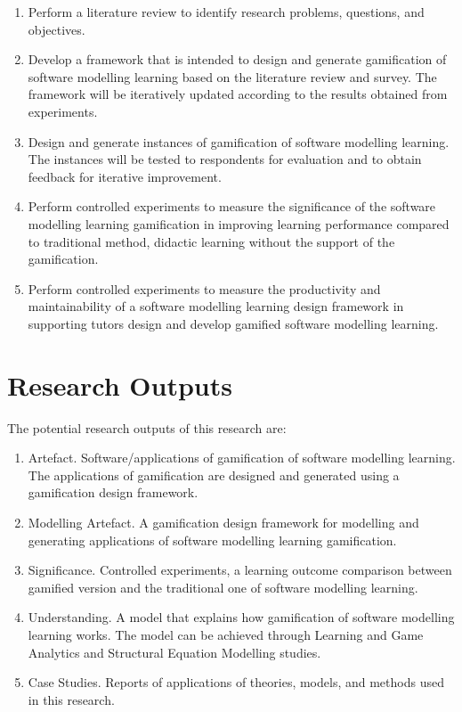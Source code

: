 \documentclass[12pt, a4paper]{report}
\begin{document}
{\begin{enumerate}
\item Perform a literature review to identify research problems, questions, and objectives. 
\item Develop a framework that is intended to design and generate gamification of software modelling learning based on the literature review and survey. The framework will be iteratively updated according to the results obtained from experiments. 
\item Design and generate instances of gamification of software modelling learning. The instances will be tested to respondents for evaluation and to obtain feedback for iterative improvement. 
\item Perform controlled experiments to measure the significance of the software modelling learning gamification in improving learning performance compared to traditional method, didactic learning without the support of the gamification.
\item Perform controlled experiments to measure the productivity and maintainability of a software modelling learning design framework in supporting tutors design and develop gamified software modelling learning. 
\end{enumerate}

\section{Research Outputs}
The potential research outputs of this research are:
\begin{enumerate}
\item Artefact. Software/applications of gamification of software modelling learning. The applications of gamification are designed and generated using a gamification design framework. 
\item Modelling Artefact. A gamification design framework for modelling and generating applications of software modelling learning gamification.
\item Significance. Controlled experiments, a learning outcome comparison between gamified version and the traditional one of software modelling learning.
\item Understanding. A model that explains how gamification of software modelling learning works. The model can be achieved through Learning and Game Analytics and Structural Equation Modelling studies.
\item Case Studies. Reports of applications of theories, models, and methods used in this research.
\end{enumerate}

}
\end{document}
